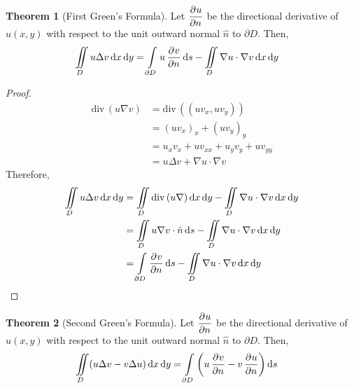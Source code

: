 \documentclass[titlepage, fleqn, a4paper, 12pt, twoside]{article}
\theoremstyle{definition}
\theoremstyle{theorem}
\newtheorem{theorem}{Theorem}
\newcommand{\divergence}{\mathrm{div\,}}
\begin{document}
\begin{theorem}[First Green's Formula]
	Let $\dpd{u}{n}$ be the directional derivative of $u(x,y)$ with respect to the unit outward normal $\hat{n}$ to $\partial D$.
	Then,
	\begin{align*}
		\iint\limits_{D} u \Delta v \dif x \dif y & = \int\limits_{\partial D} u \dpd{v}{n} \dif s - \iint\limits_{D} \nabla u \cdot \nabla v \dif x \dif y
	\end{align*}
	\label{thm:First_Green's_Formula}
\end{theorem}

\begin{proof}
	\begin{align*}
		\divergence(u \nabla v) & = \divergence\left( (u v_x,u v_y) \right)   \\
                                        & = (u v_x)_x + (u v_y)_y                     \\
                                        & = u_x v_x + u v_{x x} + u_y v_y + u v_{y y} \\
                                        & = u \Delta v + \nabla u \cdot \nabla v
	\end{align*}
	Therefore,
	\begin{align*}
		\iint\limits_{D} u \Delta v \dif x \dif y & = \iint\limits_{D} \divergence(u \nabla ) \dif x \dif y - \iint\limits_{D} \nabla u \cdot \nabla v \dif x \dif y \\
                                                          & = \iint\limits_{D} u \nabla v \cdot \hat{n} \dif s - \iint\limits_{D} \nabla u \cdot \nabla v \dif x \dif y      \\
                                                          & = \int\limits_{\partial D} \dpd{v}{n} \dif s - \iint\limits_{D} \nabla u \cdot \nabla v \dif x \dif y
	\end{align*}
\end{proof}

\begin{theorem}[Second Green's Formula]
	Let $\dpd{u}{n}$ be the directional derivative of $u(x,y)$ with respect to the unit outward normal $\hat{n}$ to $\partial D$.
	Then,
	\begin{align*}
		\iint\limits_{D} (u \Delta v - v \Delta u) \dif x \dif y & = \int\limits_{\partial D} \left( u \dpd{v}{n} - v \dpd{u}{n} \right) \dif s
	\end{align*}
	\label{thm:Second_Green's_Formula}
\end{theorem}
\end{document}
